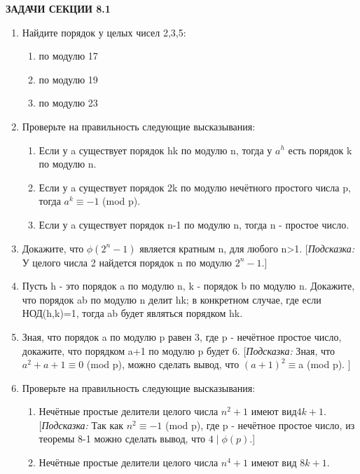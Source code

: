 \documentclass[twoside,12pt]{article}
\begin{document}
\rhead{\textbf{\thepage}}
\begin{center}\textbf{ЗАДАЧИ СЕКЦИИ 8.1}\end{center}
{\footnotesize \begin{enumerate}[label=\textbf{\arabic*.}]
	\item Найдите порядок у целых чисел 2,3,5: \begin{enumerate}
	   \item по модулю 17
	   \item по модулю 19
	   \item по модулю 23 \end{enumerate}
	\item Проверьте на правильность следующие высказывания:\begin{enumerate}
		\item Если у a существует порядок hk по модулю n, тогда у $a^{h}$ есть порядок k по модулю n.
		\item Если у a существует порядок 2k по модулю нечётного простого числа p, тогда $a^{k}\equiv-1$ (mod p).
		\item Если у a существует порядок n-1 по модулю n, тогда n - простое число. \end{enumerate}
	\item Докажите, что $\phi(2^{n}-1)$ является кратным n, для любого n>1.
 [\textit{Подсказка:} У целого числа 2 найдется порядок n по модулю $2^{n}-1$.]
        \item Пусть h - это порядок a по модулю n, k - порядок b по модулю n. Докажите, что порядок ab по модулю n делит hk; в конкретном случае, где если НОД(h,k)=1, тогда ab будет являться порядком hk.
        \item Зная, что порядок a по модулю p равен 3, где p - нечётное простое число, докажите, что порядком a+1 по модулю p будет 6.
         [\textit{Подсказка:} Зная, что $a^{2}+a+1\equiv0$ (mod p), можно сделать вывод, что $(a+1)^{2}\equiv$a (mod p). ]  
    \item Проверьте на правильность следующие высказывания:\begin{enumerate}
         \item Нечётные простые делители целого числа $n^{2}+1$ имеют вид\break $4k+1$. 
         [\textit{Подсказка:} Так как $n^{2}\equiv-1$ (mod p), где p - нечётное простое число, из теоремы 8-1 можно сделать вывод, что  $4\mid\phi(p)$.]
         \item Нечётные простые делители целого числа $n^{4}+1$ имеют вид $8k+1$.

\end{enumerate}
\end{enumerate}}
\end{document}
